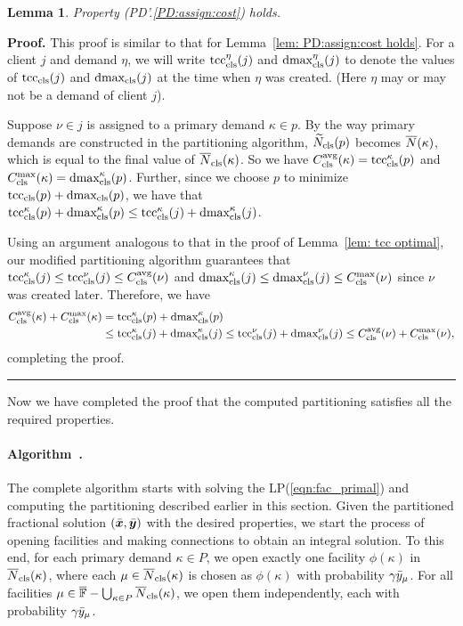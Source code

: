 \documentclass[oneside,final]{ucr}
\newtheorem{lemma}[theorem]{Lemma}
\newenvironment{proof}[1][Proof]{\textbf{#1.} }{\ \rule{0.5em}{0.5em}}
\begin{document}
\begin{lemma}\label{lem: PD1: primary optimal}
  Property (PD'.\ref{PD:assign:cost}) holds.
\end{lemma}
\begin{proof}
This proof is similar to that for Lemma~\ref{lem: PD:assign:cost holds}.
For a client $j$ and demand $\eta$, we will write
$\tcccls^\eta(j)$ and $\dmaxcls^\eta(j)$ to denote the values of
$\tcccls(j)$ and $\dmaxcls(j)$ at the time when $\eta$
was created. (Here $\eta$ may or may not be a demand of client $j$).

Suppose $\nu \in j$ is assigned to a primary demand $\kappa \in p$.
By the way primary demands are constructed in the partitioning
algorithm, $\wtildeclsnb(p)$ becomes $\wbarN(\kappa)$, which is equal
to the final value of $\wbarclsnb(\kappa)$. So we have
$\clsdist(\kappa) = \tcccls^\kappa (p)$ and $\clsmax(\kappa) =
\dmaxcls^\kappa(p)$. Further, since we choose $p$ to minimize
$\tcccls(p) + \dmaxcls(p)$, we have that $\tcccls^\kappa(p) +
\dmaxcls^\kappa(p) \leq \tcccls^\kappa(j) + \dmaxcls^\kappa(j)$.

Using an argument analogous to that in the proof of Lemma~\ref{lem: tcc optimal}, 
our modified partitioning algorithm guarantees that
  $\tcccls^{\kappa}(j) \leq \tcccls^{\nu}(j) \leq \clsdist(\nu)$ and
  $\dmaxcls^{\kappa}(j) \leq \dmaxcls^{\nu}(j) \leq \clsmax(\nu)$ since $\nu$ was
  created later.
  Therefore, we have
%
  \begin{align*}
    \clsdist(\kappa) + \clsmax(\kappa) &= \tcccls^{\kappa}(p) +	\dmaxcls^{\kappa}(p) 
					\\
					&\leq \tcccls^{\kappa}(j) + \dmaxcls^{\kappa}(j) 
					\leq \tcccls^{\nu}(j) + \dmaxcls^{\nu}(j) 
					\leq \clsdist(\nu) + \clsmax(\nu),
  \end{align*}
%
completing the proof.
\end{proof}


Now we have completed the proof that the computed partitioning satisfies
all the required properties. 


\paragraph{Algorithm~{\EBGS}.}
The complete algorithm starts with solving the LP(\ref{eqn:fac_primal}) and
computing the partitioning described earlier in this section.  Given
the partitioned fractional solution $(\barbfx, \barbfy)$ with the
desired properties, we start the process of opening facilities and
making connections to obtain an integral solution. To this end, for
each primary demand $\kappa\in P$, we open exactly one facility
$\phi(\kappa)$ in $\wbarclsnb(\kappa)$, where each
$\mu\in\wbarclsnb(\kappa)$ is chosen as $\phi(\kappa)$ with
probability $\gamma\bary_{\mu}$. For all facilities
$\mu\in\facilityset - \bigcup_{\kappa\in P}\wbarclsnb(\kappa)$, we
open them independently, each with probability
$\gamma\bary_{\mu}$. 
\end{document}

